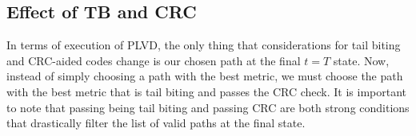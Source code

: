 \subsection{Effect of TB and CRC}

In terms of execution of PLVD, the only thing that considerations for tail biting and CRC-aided codes change is our chosen path at the final $t=T$ state. Now, instead of simply choosing a path with the best metric, we must choose the path with the best metric that is tail biting and passes the CRC check. It is important to note that passing being tail biting and passing CRC are both strong conditions that drastically filter the list of valid paths at the final state. 



